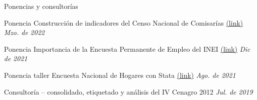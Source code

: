 \documentclass[
11pt, %
]{resume} %
\begin{document}
	
	
	\begin{rSection}{Ponencias y consultorías}
		
		\item Ponencia Construcción de indicadores del Censo Nacional de Comisarías  
		\href{https://bit.ly/3JgRMjN}{(link)} \hfill \textit{Mzo. de 2022}  
		\item Ponencia Importancia de la Encuesta Permanente de Empleo del INEI \href{https://bit.ly/3ISHYuX}{(link)}  \hfill \textit{Dic de 2021} 
		\item Ponencia taller Encuesta Nacional de Hogares con Stata \href{https://bit.ly/3mpje65}{(link)} \hfill \textit{Ago. de 2021} 
		\item Consultoría – consolidado, etiquetado y análisis del IV Cenagro 2012 \hfill \textit{Jul. de 2019} 
		
	\end{rSection}
	
	
	
	
	
\end{document}
